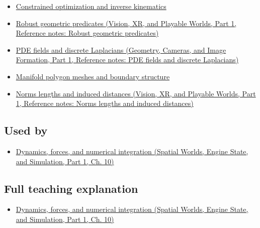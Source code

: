 \hypertarget{appendix-a9ba01fa72a6-prerequisites}{}

\begin{itemize}
\tightlist
\item
  \hyperref[appendix-29f4bea4c2bb]{Constrained optimization and inverse kinematics}
\item
  \href{../07-Vision-XR-and-Playable-Worlds-P01/main.pdf\#nameddest=appendix-341296fb3f64}{Robust geometric predicates (Vision, XR, and Playable Worlds, Part 1, Reference notes: Robust geometric predicates)}
\item
  \href{../03-Geometry-Cameras-and-Image-Formation-P01/main.pdf\#nameddest=appendix-1988d465c119}{PDE fields and discrete Laplacians (Geometry, Cameras, and Image Formation, Part 1, Reference notes: PDE fields and discrete Laplacians)}
\item
  \hyperref[appendix-fab348609369]{Manifold polygon meshes and boundary structure}
\item
  \href{../07-Vision-XR-and-Playable-Worlds-P01/main.pdf\#nameddest=appendix-49933872bb51}{Norms lengths and induced distances (Vision, XR, and Playable Worlds, Part 1, Reference notes: Norms lengths and induced distances)}
\end{itemize}

\subsection{Used by}\label{appendix-a9ba01fa72a6-used-by}

\hypertarget{appendix-a9ba01fa72a6-used-by}{}

\begin{itemize}
\tightlist
\item
  \href{../05-Spatial-Worlds-Engine-State-and-Simulation-P01/main.pdf\#nameddest=04-visual-computing-ii-ch029-dynamics-forces-and-numerical-integration}{Dynamics, forces, and numerical integration (Spatial Worlds, Engine State, and Simulation, Part 1, Ch. 10)}
\end{itemize}

\subsection{Full teaching explanation}\label{appendix-a9ba01fa72a6-full-teaching-explanation}

\hypertarget{appendix-a9ba01fa72a6-full-teaching-explanation}{}

\begin{itemize}
\tightlist
\item
  \href{../05-Spatial-Worlds-Engine-State-and-Simulation-P01/main.pdf\#nameddest=04-visual-computing-ii-ch029-dynamics-forces-and-numerical-integration}{Dynamics, forces, and numerical integration (Spatial Worlds, Engine State, and Simulation, Part 1, Ch. 10)}
\end{itemize}

